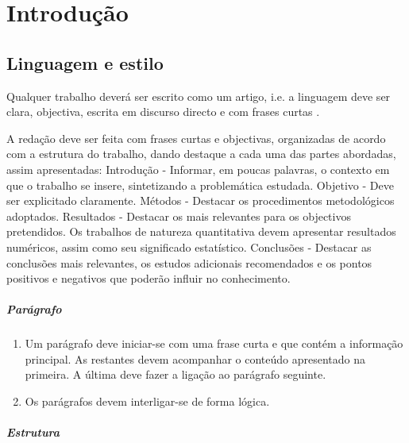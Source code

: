 % 
%  
%
\chapter{Introdução}
\label{cha:introduction}

\section{Linguagem e estilo}
Qualquer trabalho deverá ser escrito como um artigo, i.e. a linguagem deve ser clara, objectiva, escrita em discurso directo e com frases curtas \cite{gustavii2016write}.

A redação deve ser feita com frases curtas e objectivas, organizadas de acordo com a estrutura do trabalho, dando destaque a cada uma das partes abordadas, assim apresentadas: Introdução - Informar, em poucas palavras, o contexto em que o trabalho se insere, sintetizando a problemática estudada. Objetivo - Deve ser explicitado claramente. Métodos - Destacar os procedimentos metodológicos adoptados. Resultados - Destacar os mais relevantes para os objectivos pretendidos. Os trabalhos de natureza quantitativa devem apresentar resultados numéricos, assim como seu significado estatístico. Conclusões - Destacar as conclusões mais relevantes, os estudos adicionais recomendados e os pontos positivos e negativos que poderão influir no conhecimento. 

\paragraph{Parágrafo}
\begin{enumerate}
\item Um parágrafo  deve iniciar-se com uma frase curta e que contém a informação principal. As restantes devem acompanhar o conteúdo apresentado na primeira. A última deve fazer a ligação ao parágrafo seguinte.
\item Os parágrafos devem interligar-se de forma lógica.
\end{enumerate}

\paragraph{Estrutura}

